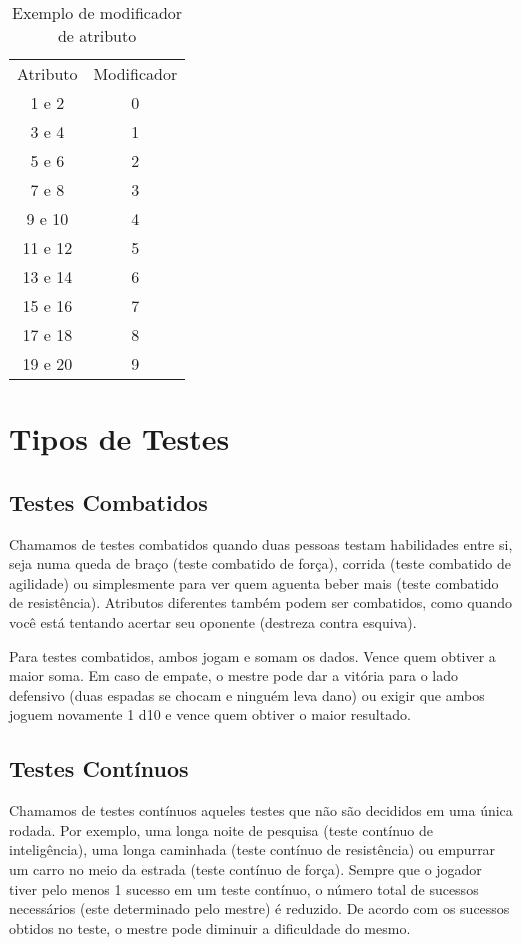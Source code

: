 \begin{table}[htbp]
\begin{center}
\begin{tabular}{|c|c|} \hline 
Atributo&	 Modificador\\\cline{1-2} 
1 e 2&	 0\\ \hline
3 e 4&	 1\\ \hline
5 e 6&	 2\\ \hline
7 e 8&	 3\\ \hline
9 e 10&	 4\\ \hline
11 e 12&	 5\\ \hline
13 e 14&	 6\\ \hline
15 e 16&	 7\\ \hline
17 e 18&	 8\\ \hline
19 e 20&	 9\\ \hline
\end{tabular}
\end{center}
\caption{Exemplo de modificador de atributo}
\label{}
\end{table}


\section{Tipos de Testes}

\subsection{Testes Combatidos}

Chamamos de testes combatidos quando duas pessoas testam habilidades entre si, seja numa queda de braço (teste combatido de força), corrida (teste combatido de agilidade) ou simplesmente para ver quem aguenta beber mais (teste combatido de resistência). Atributos diferentes também podem ser combatidos, como quando você está tentando acertar seu oponente (destreza contra esquiva).

Para testes combatidos, ambos jogam e somam os dados. Vence quem obtiver a maior soma. Em caso de empate, o mestre pode dar a vitória para o lado defensivo (duas espadas se chocam e ninguém leva dano) ou exigir que ambos joguem novamente 1 d10 e vence quem obtiver o maior resultado.
\subsection{Testes Contínuos}

Chamamos de testes contínuos aqueles testes que não são decididos em uma única rodada. Por exemplo, uma longa noite de pesquisa (teste contínuo de inteligência), uma longa caminhada (teste contínuo de resistência) ou empurrar um carro no meio da estrada (teste contínuo de força).
Sempre que o jogador tiver pelo menos 1 sucesso em um teste contínuo, o número total de sucessos necessários (este determinado pelo mestre) é reduzido. De acordo com os sucessos obtidos no teste, o mestre pode diminuir a dificuldade do mesmo.

